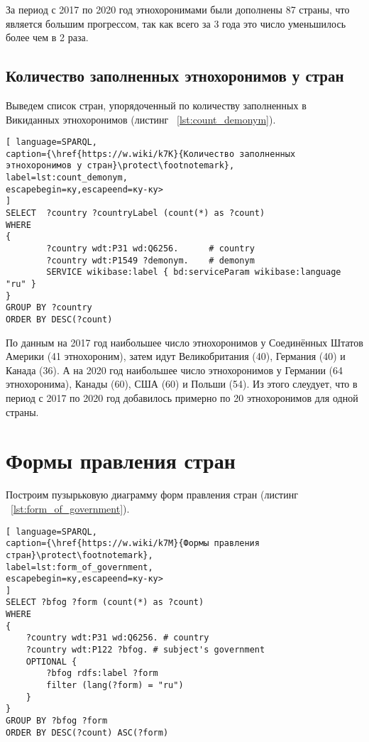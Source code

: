  За период с 2017 по 2020 год этнохоронимами были дополнены 87 страны, что является большим прогрессом, так как всего за 3 года это число уменьшилось более чем в 2 раза.    

\subsection{Количество заполненных этнохоронимов у стран}

Выведем список стран, упорядоченный по количеству заполненных в Викиданных этнохоронимов (листинг ~\ref{lst:count_demonym}).

\begin{lstlisting}[ language=SPARQL, 
caption={\href{https://w.wiki/k7K}{Количество заполненных этнохоронимов у стран}\protect\footnotemark},
label=lst:count_demonym, 
escapebegin=ку,escapeend=ку-ку>
]
SELECT  ?country ?countryLabel (count(*) as ?count)
WHERE
{
		?country wdt:P31 wd:Q6256.      # country
		?country wdt:P1549 ?demonym.    # demonym
		SERVICE wikibase:label { bd:serviceParam wikibase:language "ru" }
}
GROUP BY ?country 
ORDER BY DESC(?count)
\end{lstlisting}


По данным на 2017 год наибольшее число этнохоронимов у Соединённых Штатов Америки (41 этнохороним), затем идут Великобритания (40), Германия (40) и Канада (36). А на 2020 год наибольшее число этнохоронимов у Германии (64 этнохоронима), Канады (60), США (60) и Польши (54). Из этого слеудует, что в период с 2017 по 2020 год добавилось примерно по 20 этнохоронимов для одной страны.


\section{Формы правления стран}

Построим пузырьковую диаграмму форм правления стран (листинг ~\ref{lst:form_of_government}).

\begin{lstlisting}[ language=SPARQL, 
caption={\href{https://w.wiki/k7M}{Формы правления стран}\protect\footnotemark},
label=lst:form_of_government, 
escapebegin=ку,escapeend=ку-ку>
]
SELECT ?bfog ?form (count(*) as ?count)
WHERE 
{
	?country wdt:P31 wd:Q6256. # country
	?country wdt:P122 ?bfog. # subject's government
	OPTIONAL {
		?bfog rdfs:label ?form
		filter (lang(?form) = "ru")
	}
}
GROUP BY ?bfog ?form
ORDER BY DESC(?count) ASC(?form)
\end{lstlisting}

